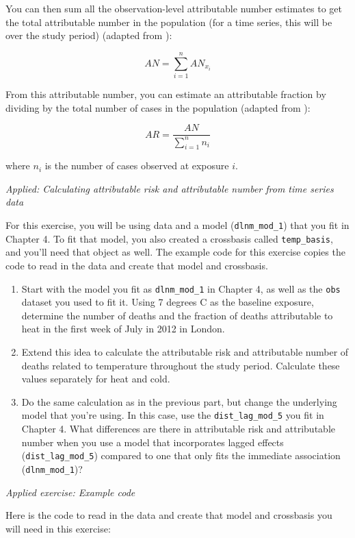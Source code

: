 \documentclass[
]{book}
\providecommand{\tightlist}{%
  \setlength{\itemsep}{0pt}\setlength{\parskip}{0pt}}
\begin{document}
You can then sum all the observation-level attributable number estimates to get the total attributable number in the population (for a time series, this will be over the study period) (adapted from \citet{gasparrini2014attributable}):

\[
AN = \sum_{i=1}^{n}{AN_{x_i}} 
\]

From this attributable number, you can estimate an attributable fraction by dividing by the total number of cases in the population (adapted from \citet{gasparrini2014attributable}):

\[
AR = \frac{AN}{\sum_{i=1}^{n}{n_i}}
\]

where \(n_i\) is the number of cases observed at exposure \(i\).

\emph{Applied: Calculating attributable risk and attributable number from time series data}

For this exercise, you will be using data and a model (\texttt{dlnm\_mod\_1}) that you fit in Chapter 4. To fit that model, you also created a crossbasis called \texttt{temp\_basis}, and you'll need that object as well. The example code for this exercise copies the code to read in the data and create that model and crossbasis.

\begin{enumerate}
\def\labelenumi{\arabic{enumi}.}
\tightlist
\item
  Start with the model you fit as \texttt{dlnm\_mod\_1} in Chapter 4, as well as the \texttt{obs} dataset you used to fit it. Using 7 degrees C as the baseline exposure, determine the number of deaths and the fraction of deaths attributable to heat in the first week of July in 2012 in London.
\item
  Extend this idea to calculate the attributable risk and attributable number of deaths related to temperature throughout the study period. Calculate these values separately for heat and cold.
\item
  Do the same calculation as in the previous part, but change the underlying model that you're using. In this case, use the \texttt{dist\_lag\_mod\_5} you fit in Chapter 4. What differences are there in attributable risk and attributable number when you use a model that incorporates lagged effects (\texttt{dist\_lag\_mod\_5}) compared to one that only fits the immediate association (\texttt{dlnm\_mod\_1})?
\end{enumerate}

\emph{Applied exercise: Example code}

Here is the code to read in the data and create that model and crossbasis you will need in this exercise:
\end{document}
